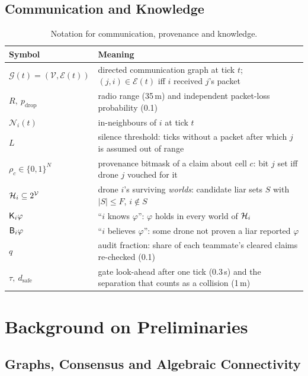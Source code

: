 \subsection{Communication and Knowledge}

\begin{table}[h]
\centering
\renewcommand{\arraystretch}{1.2}
\begin{tabularx}{\linewidth}{@{}l X@{}}
\toprule
\textbf{Symbol} & \textbf{Meaning} \\
\midrule
$\mathcal{G}(t)=(\mathcal{V},\mathcal{E}(t))$ & directed communication graph at tick $t$; $(j,i)\in\mathcal{E}(t)$ iff $i$
received $j$'s packet \\
$R,\ p_{\mathrm{drop}}$ & radio range (35\,m) and independent packet-loss probability (0.1) \\
$\mathcal{N}_i(t)$ & in-neighbours of $i$ at tick $t$ \\
$L$ & silence threshold: ticks without a packet after which $j$ is assumed out of range \\
$\rho_c\in\{0,1\}^N$ & provenance bitmask of a claim about cell $c$: bit $j$ set iff drone $j$ vouched for it \\
$\mathcal{H}_i\subseteq 2^{\mathcal{V}}$ & drone $i$'s surviving \emph{worlds}: candidate liar sets $S$ with $|S|\le F$, $i\notin S$ \\
$\mathsf{K}_i\varphi$ & ``$i$ knows $\varphi$'': $\varphi$ holds in every world of $\mathcal{H}_i$ \\
$\mathsf{B}_i\varphi$ & ``$i$ believes $\varphi$'': some drone not proven a liar reported $\varphi$ \\
$q$ & audit fraction: share of each teammate's cleared claims re-checked (0.1) \\
$\tau,\ d_{\mathrm{safe}}$ & gate look-ahead after one tick (0.3\,s) and the separation that counts as a collision (1\,m) \\
\bottomrule
\end{tabularx}
\caption{Notation for communication, provenance and knowledge.}
\label{tab:notation-knowledge}
\end{table}

\section{Background on Preliminaries}
\label{sec:background}

\subsection{Graphs, Consensus and Algebraic Connectivity}

